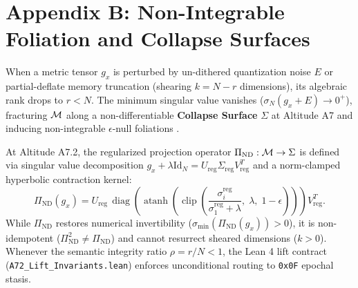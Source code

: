 \section*{Appendix B: Non-Integrable Foliation and Collapse Surfaces}
\label{app:foliation}

\begin{definition}
When a metric tensor $g_x$ is perturbed by un-dithered quantization noise $E$ or partial-deflate memory truncation (shearing $k = N - r$ dimensions), its algebraic rank drops to $r < N$. The minimum singular value vanishes ($\sigma_N(g_x + E) \to 0^+$), fracturing $\mathcal{M}$ along a non-differentiable \textbf{Collapse Surface} $\Sigma$ at Altitude A7 and inducing non-integrable $\epsilon$-null foliations \cite{anonymous2026geometry}.
\end{definition}

\begin{proposition}
At Altitude A7.2, the regularized projection operator $\Pi_{\mathrm{ND}} : \mathcal{M} \to \Sigma$ is defined via singular value decomposition $g_x + \lambda \mathrm{Id}_N = U_{\mathrm{reg}} \Sigma_{\mathrm{reg}} V_{\mathrm{reg}}^T$ and a norm-clamped hyperbolic contraction kernel:
\begin{equation}
  \Pi_{\mathrm{ND}}(g_x) = U_{\mathrm{reg}} \, \operatorname{diag}\!\left(\operatorname{atanh}\!\left(\operatorname{clip}\!\left(\frac{\sigma_i^{\mathrm{reg}}}{\sigma_1^{\mathrm{reg}} + \lambda},\; \lambda,\; 1 - \epsilon\right)\right)\right) V_{\mathrm{reg}}^T.
\end{equation}
While $\Pi_{\mathrm{ND}}$ restores numerical invertibility ($\sigma_{\min}(\Pi_{\mathrm{ND}}(g_x)) > 0$), it is non-idempotent ($\Pi_{\mathrm{ND}}^2 \neq \Pi_{\mathrm{ND}}$) and cannot resurrect sheared dimensions ($k > 0$). Whenever the semantic integrity ratio $\rho = r/N < 1$, the Lean 4 lift contract (\texttt{A72\_Lift\_Invariants.lean}) enforces unconditional routing to \texttt{0x0F} epochal stasis.
\end{proposition}
